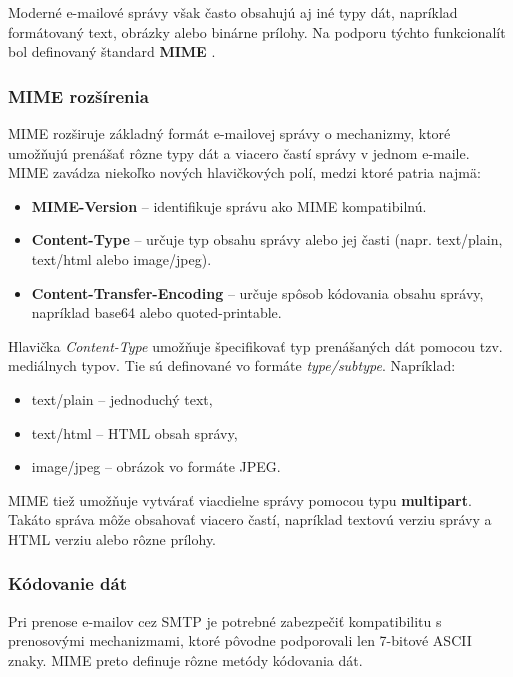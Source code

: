 \documentclass[conference]{IEEEtran}
\begin{document}
Moderné e-mailové správy však často obsahujú aj iné typy dát, napríklad 
formátovaný text, obrázky alebo binárne prílohy. Na podporu týchto 
funkcionalít bol definovaný štandard \textbf{MIME} \cite{rfc2045}.

\subsubsection{MIME rozšírenia}

MIME rozširuje základný formát e-mailovej správy o mechanizmy, ktoré 
umožňujú prenášať rôzne typy dát a viacero častí správy v jednom e-maile. 
MIME zavádza niekoľko nových hlavičkových polí, medzi ktoré patria najmä\cite{rfc2045}:

\begin{itemize}
\item \textbf{MIME-Version} – identifikuje správu ako MIME kompatibilnú.
\item \textbf{Content-Type} – určuje typ obsahu správy alebo jej časti 
(napr. text/plain, text/html alebo image/jpeg).
\item \textbf{Content-Transfer-Encoding} – určuje spôsob kódovania 
obsahu správy, napríklad base64 alebo quoted-printable.
\end{itemize}

Hlavička \textit{Content-Type} umožňuje špecifikovať typ prenášaných 
dát pomocou tzv. mediálnych typov. Tie sú definované vo formáte 
\textit{type/subtype}\cite{rfc2045}. Napríklad:

\begin{itemize}
\item text/plain – jednoduchý text,
\item text/html – HTML obsah správy,
\item image/jpeg – obrázok vo formáte JPEG.
\end{itemize}

MIME tiež umožňuje vytvárať viacdielne správy pomocou typu 
\textbf{multipart}. Takáto správa môže obsahovať viacero častí, 
napríklad textovú verziu správy a HTML verziu alebo rôzne prílohy.\cite{rfc2045}

\subsubsection{Kódovanie dát}

Pri prenose e-mailov cez SMTP je potrebné zabezpečiť kompatibilitu 
s prenosovými mechanizmami, ktoré pôvodne podporovali len 7-bitové 
ASCII znaky. MIME preto definuje rôzne metódy kódovania dát.\cite{rfc2045}
\end{document}
